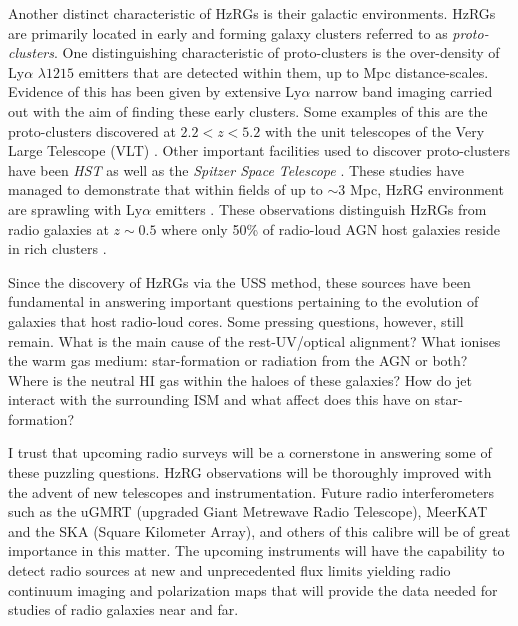 \documentclass[10pt,a4paper]{article}
\begin{document}
Another distinct characteristic of HzRGs is their galactic environments. HzRGs are primarily located in early and forming galaxy clusters referred to as {\it proto-clusters}. One distinguishing characteristic of proto-clusters is the over-density of Ly$\alpha$ $\lambda1215$ emitters that are detected within them, up to Mpc distance-scales. Evidence of this has been given by extensive Ly$\alpha$ narrow band imaging carried out with the aim of finding these early clusters. Some examples of this are the proto-clusters discovered at $2.2 < z < 5.2$ with the unit telescopes of the Very Large Telescope (VLT) \citep{Kurk2000,Venemans2002,Venemans2004,Croft2005}. Other important facilities used to discover proto-clusters have been {\it HST} as well as the {\it Spitzer Space Telescope} \citep{Miley2004,Overzier2005,Kodama2007,Galametz2010,Galametz2012}. These studies have managed to demonstrate that within fields of up to $\sim3$ Mpc, HzRG environment are sprawling with Ly$\alpha$ emitters \citep{Venemans2007}. These observations distinguish HzRGs from radio galaxies at $z\sim0.5$ where only 50\% of radio-loud AGN host galaxies reside in rich clusters \citep{HillLilly1991}. 

Since the discovery of HzRGs via the USS method, these sources have been fundamental in answering important questions pertaining to the evolution of galaxies that host radio-loud cores. Some pressing questions, however, still remain. What is the main cause of the rest-UV/optical alignment? What ionises the warm gas medium: star-formation or radiation from the AGN or both? Where is the neutral HI gas within the haloes of these galaxies? How do jet interact with the surrounding ISM and what affect does this have on star-formation? 

I trust that upcoming radio surveys will be a cornerstone in answering some of these puzzling questions. HzRG observations will be thoroughly improved with the advent of new telescopes and instrumentation. Future radio interferometers such as the uGMRT (upgraded Giant Metrewave Radio Telescope), MeerKAT and the SKA (Square Kilometer Array), and others of this calibre will be of great importance in this matter. The upcoming instruments will have the capability to detect radio sources at new and unprecedented flux limits yielding radio continuum imaging and polarization maps that will provide the data needed for studies of radio galaxies near and far. 



\end{document}
